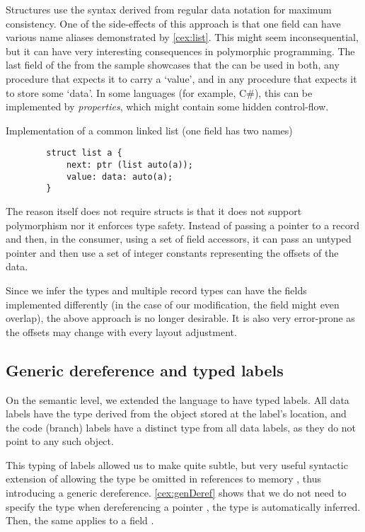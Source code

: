 Structures use the syntax derived from regular data notation for maximum consistency. One of the side-effects of this approach is that one field can have various name aliases demonstrated by \cref{cex:list}. This might seem inconsequential, but it can have very interesting consequences in polymorphic programming. The last field of the  from the sample showcases that the  can be used in both, any procedure that expects it to carry a `value', and in any procedure that expects it to store some `data'. In some languages (for example, C\#), this can be implemented by \emph{properties}, which might contain some hidden control-flow.

\begin{codex}
    \caption{Implementation of a common linked list (one field has two names)}
    \label{cex:list}

    \begin{lstlisting}
        struct list a {
            next: ptr (list auto(a));
            value: data: auto(a);
        }
    \end{lstlisting}
\end{codex}

The reason \cmm itself does not require structs is that it does not support polymorphism nor it enforces type safety. Instead of passing a pointer to a record and then, in the consumer, using a set of field accessors, it can pass an untyped pointer and then use a set of integer constants representing the offsets of the data.

Since we infer the types and multiple record types can have the fields implemented differently (in the case of our modification, the field might even overlap), the above approach is no longer desirable. It is also very error-prone as the offsets may change with every layout adjustment.

\subsection{Generic dereference and typed labels}
\label{sec:genDerefDef}
On the semantic level, we extended the language to have typed labels. All data labels have the type derived from the object stored at the label's location, and the code (branch) labels have a distinct type from all data labels, as they do not point to any such object.

This typing of labels allowed us to make quite subtle, but very useful syntactic extension of allowing the type be omitted in references to memory \cite{ramsey2005c}, thus introducing a generic dereference. \cref{cex:genDeref} shows that we do not need to specify the type when dereferencing a pointer , the type is automatically inferred. Then, the same applies to a  field .

